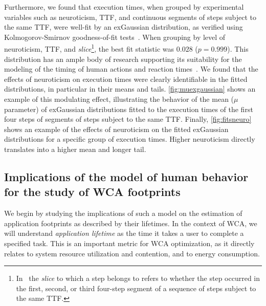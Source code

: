 Furthermore, we found that execution times, when grouped by experimental variables such as neuroticism, \gls{TTF}, and continuous segments of steps subject to the same \gls{TTF}, were well-fit by an \gls{exGaussian} distribution, as verified using Kolmogorov-Smirnov goodness-of-fit tests~\cite{massey_jr1951kolmogorov}.
When grouping by level of neuroticism, \gls{TTF}, and \emph{slice}\footnote{%
In~\cite{olguinmunoz2021impact} the \emph{slice} to which a step belongs to refers to whether the step occurred in the first, second, or third four-step segment of a sequence of steps subject to the same \gls{TTF}.
}, the best fit statistic was \ensuremath{0.028} (\ensuremath{p = 0.999}).
This distribution has an ample body of research supporting its suitability for the modeling of the timing of human actions and reaction times~\cite{rohrer1994analysis,palmer2011what,marmolejo_ramos2022generalised}.
We found that the effects of neuroticism on execution times were clearly identifiable in the fitted distributions, in particular in their means and tails.
\cref{fig:muexgaussian} shows an example of this modulating effect, illustrating the behavior of the mean (\( \mu \) parameter) of \gls{exGaussian} distributions fitted to the execution times of the first four steps of segments of steps subject to the same \gls{TTF}.
Finally, \cref{fig:fitsneuro} shows an example of the effects of neuroticism on the fitted \gls{exGaussian} distributions for a specific group of execution times.
Higher neuroticism directly translates into a higher mean and longer tail.

\subsection{Implications of the model of human behavior for the study of \gls{WCA} footprints}\label{sec:implications:footprint}



We begin by studying the implications of such a model on the estimation of application footprints as described by their lifetimes.
In the context of \gls{WCA}, we will understand \emph{application lifetime} as the time it takes a user to complete a specified task.
This is an important metric for \gls{WCA} optimization, as it directly relates to system resource utilization and contention, and to energy consumption.

